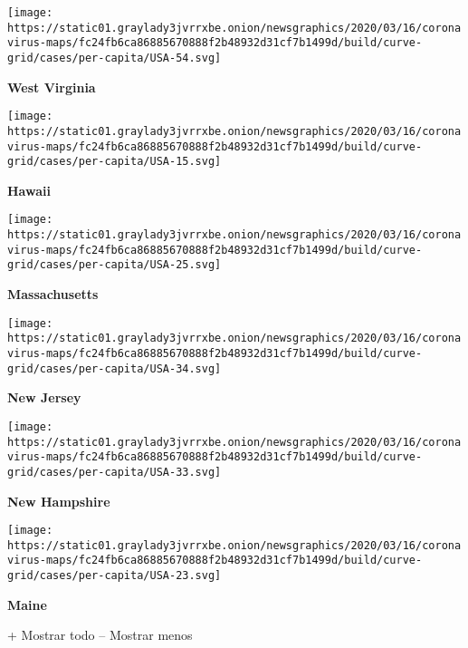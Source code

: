 \href{https://www.nytimes3xbfgragh.onion/interactive/2020/us/west-virginia-coronavirus-cases.html}{}

\texttt{[image: https://static01.graylady3jvrrxbe.onion/newsgraphics/2020/03/16/coronavirus-maps/fc24fb6ca86885670888f2b48932d31cf7b1499d/build/curve-grid/cases/per-capita/USA-54.svg]}

\textbf{West Virginia}

\href{https://www.nytimes3xbfgragh.onion/interactive/2020/us/hawaii-coronavirus-cases.html}{}

\texttt{[image: https://static01.graylady3jvrrxbe.onion/newsgraphics/2020/03/16/coronavirus-maps/fc24fb6ca86885670888f2b48932d31cf7b1499d/build/curve-grid/cases/per-capita/USA-15.svg]}

\textbf{Hawaii}

\href{https://www.nytimes3xbfgragh.onion/interactive/2020/us/massachusetts-coronavirus-cases.html}{}

\texttt{[image: https://static01.graylady3jvrrxbe.onion/newsgraphics/2020/03/16/coronavirus-maps/fc24fb6ca86885670888f2b48932d31cf7b1499d/build/curve-grid/cases/per-capita/USA-25.svg]}

\textbf{Massachusetts}

\href{https://www.nytimes3xbfgragh.onion/interactive/2020/us/new-jersey-coronavirus-cases.html}{}

\texttt{[image: https://static01.graylady3jvrrxbe.onion/newsgraphics/2020/03/16/coronavirus-maps/fc24fb6ca86885670888f2b48932d31cf7b1499d/build/curve-grid/cases/per-capita/USA-34.svg]}

\textbf{New Jersey}

\href{https://www.nytimes3xbfgragh.onion/interactive/2020/us/new-hampshire-coronavirus-cases.html}{}

\texttt{[image: https://static01.graylady3jvrrxbe.onion/newsgraphics/2020/03/16/coronavirus-maps/fc24fb6ca86885670888f2b48932d31cf7b1499d/build/curve-grid/cases/per-capita/USA-33.svg]}

\textbf{New Hampshire}

\href{https://www.nytimes3xbfgragh.onion/interactive/2020/us/maine-coronavirus-cases.html}{}

\texttt{[image: https://static01.graylady3jvrrxbe.onion/newsgraphics/2020/03/16/coronavirus-maps/fc24fb6ca86885670888f2b48932d31cf7b1499d/build/curve-grid/cases/per-capita/USA-23.svg]}

\textbf{Maine}

+ Mostrar todo -- Mostrar menos

